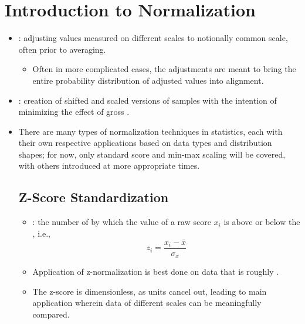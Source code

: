 \section{Introduction to Normalization}
\begin{itemize}
  \item {}: adjusting values measured on different scales to notionally common scale, often prior to averaging.
    \begin{itemize}
      \item Often in more complicated cases, the adjustments are meant to bring the entire probability distribution of adjusted values into alignment.
    \end{itemize}
  \item {}: creation of shifted and scaled versions of samples with the intention of minimizing the effect of gross \hyperref[Subsection: Outliers]{}.
  \item There are many types of normalization techniques in statistics, each with their own respective applications based on data types and distribution shapes; for now, only standard score and min-max scaling will be covered, with others introduced at more appropriate times.

  \subsection{Z-Score Standardization}
  \begin{itemize}
    \item {}: the number of \hyperref[Subsection: Measures of Dispersion]{} by which the value of a raw score \(x_i\) is above or below the \hyperref[Subsection: Measures of Central Tendency]{}, i.e., 
    \[%
    z_i = \frac{x_i - \bar{x}}{\sigma_x}
    \]%
    \item Application of z-normalization is best done on data that is roughly \hyperref[Subsection: Primer: Probability Distributions]{}. 
    \item The z-score is dimensionless, as units cancel out, leading to main application wherein data of different scales can be meaningfully compared. 
  \end{itemize}


\end{itemize}
